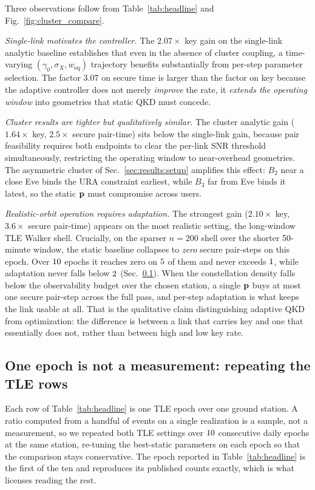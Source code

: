 Three observations follow from Table~\ref{tab:headline} and Fig.~\ref{fig:cluster_compare}.

\emph{Single-link motivates the controller.} The $2.07\times$ key gain on the single-link analytic baseline establishes that even in the absence of cluster coupling, a time-varying $(\gamma_0, \sigma_X, w_{\mathrm{eq}})$ trajectory benefits substantially from per-step parameter selection. The factor $3.07$ on secure time is larger than the factor on key because the adaptive controller does not merely \emph{improve} the rate, it \emph{extends the operating window} into geometries that static QKD must concede.

\emph{Cluster results are tighter but qualitatively similar.} The cluster analytic gain ($1.64\times$ key, $2.5\times$ secure pair-time) sits below the single-link gain, because pair feasibility requires both endpoints to clear the per-link SNR threshold simultaneously, restricting the operating window to near-overhead geometries. The asymmetric cluster of Sec.~\ref{sec:results:setup} amplifies this effect: $B_2$ near a close Eve binds the URA constraint earliest, while $B_3$ far from Eve binds it latest, so the static $\mathbf{p}$ must compromise across users.

\emph{Realistic-orbit operation requires adaptation.} The strongest gain ($2.10\times$ key, $3.6\times$ secure pair-time) appears on the most realistic setting, the long-window TLE Walker shell. Crucially, on the sparser $n{=}200$ shell over the shorter 50-minute window, the static baseline collapses to \emph{zero} secure pair-steps on this epoch. Over $10$ epochs it reaches zero on $5$ of them and never exceeds $1$, while adaptation never falls below $2$ (Sec.~\ref{sec:results:epochs}). When the constellation density falls below the observability budget over the chosen station, a single $\mathbf{p}$ buys at most one secure pair-step across the full pass, and per-step adaptation is what keeps the link usable at all. That is the qualitative claim distinguishing adaptive QKD from optimization: the difference is between a link that carries key and one that essentially does not, rather than between high and low key rate.

\subsection{One epoch is not a measurement: repeating the TLE rows}
\label{sec:results:epochs}
Each row of Table~\ref{tab:headline} is one TLE epoch over one ground station. A ratio
computed from a handful of events on a single realization is a sample, not a measurement,
so we repeated both TLE settings over $10$ consecutive daily epochs at the same
station, re-tuning the best-static parameters on each epoch so that the comparison stays
conservative. The epoch reported in Table~\ref{tab:headline} is the first of the ten and
reproduces its published counts exactly, which is what licenses reading the rest.

